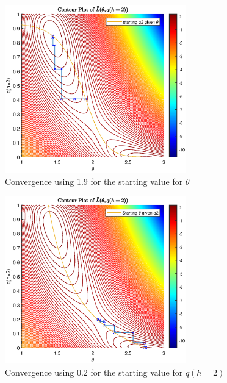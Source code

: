 \documentclass{article}
\begin{document}
\begin{figure}[H]
    \centering
    \includegraphics[width=0.7\textwidth]{converging_EM1.eps} %
    \caption{Convergence using 1.9 for the starting value for $\theta$ }
\end{figure}

\begin{figure}[H]
    \centering
    \includegraphics[width=0.7\textwidth]{converging_EM2.eps} %
    \caption{Convergence using 0.2 for the starting value for $q(h=2)$ }
\end{figure}
\end{document}
